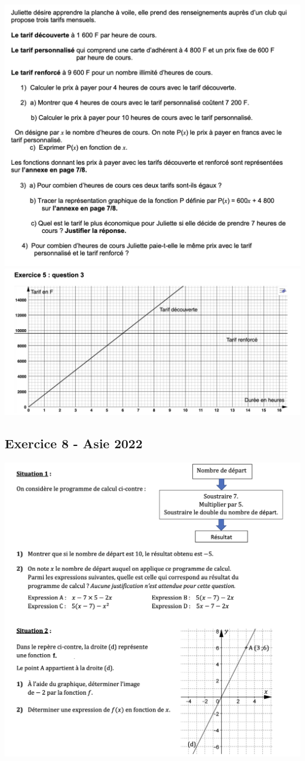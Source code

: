 \documentclass[14 pt, fleqn]{extarticle}
\theoremstyle{plain}
\begin{document}
\includegraphics[width = 20 cm]{Ex7}
\includegraphics[width = 20 cm]{Ex7A}


\subsection*{Exercice 8 - Asie 2022}	


\includegraphics[width = 20 cm]{Ex8}
 	
\end{document}
